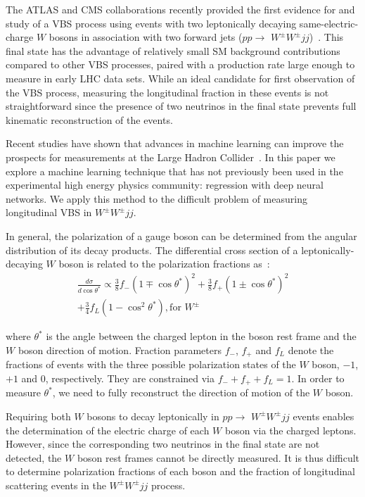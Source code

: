 \documentclass[aps,prl,twocolumn,showpacs,superscriptaddress,groupeaddress,floatfix]{revtex4}
\def\ssWW{\ensuremath{ W^{\pm}W^{\pm}jj }\xspace}
\def\ts{\ensuremath{ \theta^{*} }\xspace}
\def\cts{\ensuremath{ \cos\ts }\xspace}
\def\ctsSq{\ensuremath{ \cos^{2}\ts }\xspace}
\begin{document}
The ATLAS and CMS collaborations recently provided the first evidence
for and study of a VBS process using events with two leptonically
decaying same-electric-charge $W$ bosons in association with two
forward jets ($pp \to$ \ssWW)~\cite{ATLAS_ssWW,CMS_ssWW}. This final
state has the advantage of relatively small SM background
contributions compared to other VBS processes, paired with a
production rate large enough to measure in early LHC data sets.  While
an ideal candidate for first observation of the VBS process, measuring
the longitudinal fraction in these events is not straightforward since
the presence of two neutrinos in the final state prevents full
kinematic reconstruction of the events.

Recent studies have shown that advances in machine learning can
improve the prospects for measurements at the Large Hadron
Collider~\cite{Baldi:2014kfa,Baldi:2014pta}.  In this paper we explore
a machine learning technique that has not previously been used in the
experimental high energy physics community: regression with deep
neural networks. We apply this method to the difficult problem of
measuring longitudinal VBS in \ssWW.

In general, the polarization of a gauge boson can be determined from
the angular distribution of its decay products. The differential cross section of a
leptonically-decaying $W$ boson is related to the polarization fractions as~\cite{Wpol}:
\begin{multline}
 \label{eq:pol}
 \frac{d\sigma}{d\cts} \propto  \frac{3}{8} f_- (1 \mp \cts)^2 + \frac{3}{8} f_+ (1 \pm \cts)^2 \\ 
+\frac{3}{4} f_L (1 - \ctsSq) , {\text {for~}} W^\pm 
\end{multline}

where \ts is the angle between the charged lepton in the boson
rest frame and the $W$ boson direction of motion.  Fraction
parameters $f_{-}$, $f_{+}$ and $f_L$ denote the fractions of
events with the three possible polarization states of the $W$ boson, $-1$, $+1$ and 0,
respectively.  They are constrained via $f_- + f_+ + f_L = 1$.  In
order to measure \ts, we need to fully reconstruct the direction of
motion of the $W$ boson.

Requiring both $W$ bosons to decay leptonically in  $pp
\to$ \ssWW events enables the determination of the electric charge of
each $W$ boson via the charged leptons. However, since the
corresponding two neutrinos in the final state are not detected, the
$W$ boson rest frames cannot be directly measured.  It is thus
difficult to determine polarization fractions of each boson and
the fraction of longitudinal scattering events in the \ssWW process.
\end{document}
